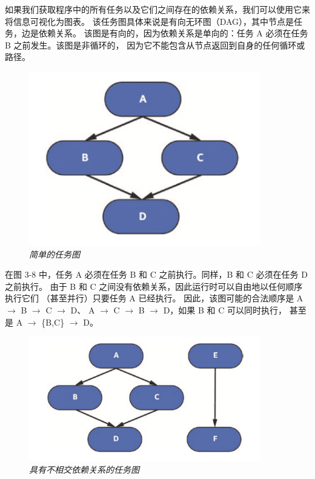 如果我们获取程序中的所有任务以及它们之间存在的依赖关系，我们可以使用它来将信息可视化为图表。 
该任务图具体来说是有向无环图（DAG），其中节点是任务，边是依赖关系。 
该图是有向的，因为依赖关系是单向的：任务 A 必须在任务 B 之前发生。该图是非循环的，
因为它不能包含从节点返回到自身的任何循环或路径。

\begin{figure}[H]
	\centering
	\includegraphics[width=0.9\textwidth]{figs/F3.8.png}
	\caption{\textit{简单的任务图}}
\end{figure}

在图 3-8 中，任务 A 必须在任务 B 和 C 之前执行。同样，B 和 C 必须在任务 D 之前执行。
由于 B 和 C 之间没有依赖关系，因此运行时可以自由地以任何顺序执行它们 （甚至并行）只要任务 A 已经执行。 
因此，该图可能的合法顺序是 A $\rightarrow$ B $\rightarrow$ C $\rightarrow$ D、
A $\rightarrow$ C $\rightarrow$ B $\rightarrow$ D，如果 B 和 C 可以同时执行，
甚至是 A $\rightarrow$ \{B,C\} $\rightarrow$ D。

\begin{figure}[H]
	\centering
	\includegraphics[width=0.9\textwidth]{figs/F3.9.png}
	\caption{\textit{具有不相交依赖关系的任务图}}
\end{figure}

